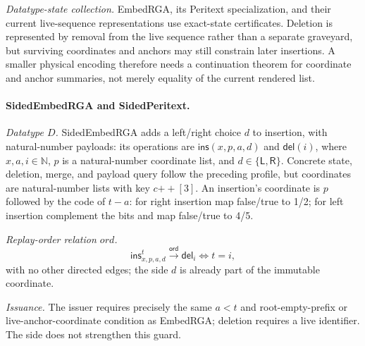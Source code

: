\documentclass[11pt]{article}
\theoremstyle{definition}
\newcommand{\N}{\mathbb N}
\newcommand{\ord}{\mathrel{\xrightarrow{\mathsf{ord}}}}
\begin{document}
\emph{Datatype-state collection.} EmbedRGA, its Peritext specialization, and their current live-sequence
representations use exact-state certificates.  Deletion is represented by removal
from the live sequence rather than a separate graveyard, but surviving
coordinates and anchors may still constrain later insertions.  A smaller
physical encoding therefore needs a continuation theorem for coordinate and
anchor summaries, not merely equality of the current rendered list.

\paragraph{SidedEmbedRGA and SidedPeritext.}

\emph{Datatype $D$.} SidedEmbedRGA adds a left/right choice $d$ to insertion, with natural-number
payloads: its operations are $\mathsf{ins}(x,p,a,d)$ and $\mathsf{del}(i)$,
where $x,a,i\in\N$, $p$ is a natural-number coordinate list, and
$d\in\{\mathsf{L},\mathsf{R}\}$. Concrete state, deletion, merge, and payload query follow the
preceding profile, but coordinates are natural-number lists with key
$c{+\!+}[3]$. An insertion's coordinate is $p$ followed by the code of $t-a$:
for right insertion map false/true to 1/2; for left insertion complement the
bits and map false/true to 4/5.

\emph{Replay-order relation $ord$.}
\[
 \mathsf{ins}^{t}_{x,p,a,d}\ord\mathsf{del}_i
 \Longleftrightarrow t=i,
\]
with no other directed edges; the side $d$ is already part of the immutable
coordinate.

\emph{Issuance.} The issuer requires precisely the same
$a<t$ and root-empty-prefix or live-anchor-coordinate condition as EmbedRGA;
deletion requires a live identifier. The side does not strengthen this guard.
\end{document}
